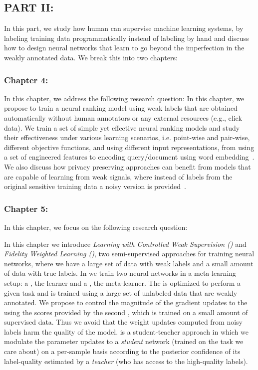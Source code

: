 \subsection*{PART II: }
In this part, we study how human can supervise machine learning systems, by labeling training data programmatically instead of labeling by hand and discuss how to design neural networks that learn to go beyond the imperfection in the weakly annotated data. We break this into two chapters:

\subsubsection*{Chapter 4: }
In this chapter, we address the following research question:
In this chapter, we propose to train a neural ranking model using weak labels that are obtained automatically without human annotators or any external resources (e.g., click data). We train a set of simple yet effective neural ranking models and study their effectiveness under various learning scenarios, i.e. point-wise and pair-wise, different objective functions, and using different input representations, from using a set of engineered features to encoding query/document using word embedding~\citep{Dehghani:2017:SIGIR}. We also discuss how privacy preserving approaches can benefit from models that are capable of learning from weak signals, where instead of labels from the original sensitive training data a noisy version is provided~\citep{dehghani:2017:neuir}.

\subsubsection*{Chapter 5: }
In this chapter, we focus on the following research question:

In this chapter we introduce \emph{Learning with Controlled Weak Supervision (\cws)} and \emph{Fidelity Weighted Learning (\fwl)}, two semi-supervised approaches for training neural networks, where we have a large set of data with weak labels and a small amount of data with true labels. 
%
In \cws we train two neural networks in a meta-learning setup: a \tnet, the learner and a \cnet, the meta-learner.  The \tnet is optimized to perform a given task and is trained using a large set of unlabeled data that are weakly annotated. We propose to control the magnitude of the gradient updates to the \tnet using the scores provided by the second \cnet, which is trained on a small amount of supervised data. Thus we avoid that the weight updates computed from noisy labels harm the quality of the \tnet model.
%
\fwl is a student-teacher approach in which we modulate the parameter updates to a \emph{student} network (trained on the task we care about) on a per-sample basis according to the posterior confidence of its label-quality estimated by a \emph{teacher} (who has access to the high-quality labels).  


